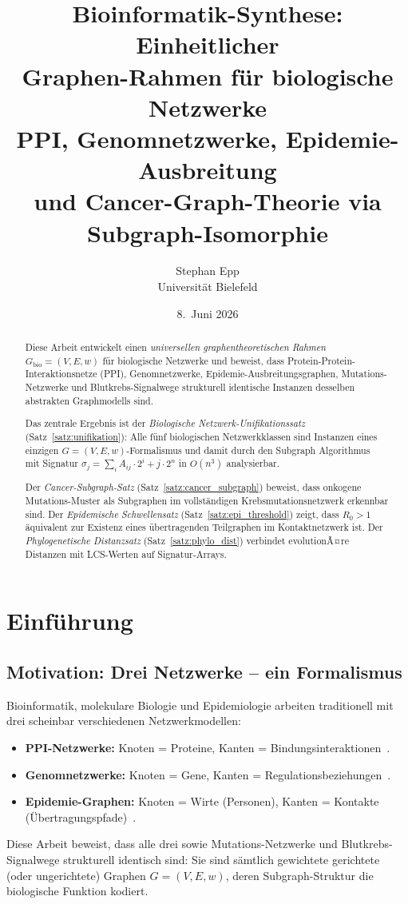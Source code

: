 ﻿\documentclass[a4paper,12pt]{article}
\title{Bioinformatik-Synthese: Einheitlicher\\
Graphen-Rahmen f\"ur biologische Netzwerke\\[6pt]
PPI, Genomnetzwerke, Epidemie-Ausbreitung\\
und Cancer-Graph-Theorie via Subgraph-Isomorphie}
\author{Stephan Epp\\[4pt]
\small Universit\"at Bielefeld}
\date{8.\ Juni 2026}
\theoremstyle{plain}
\theoremstyle{definition}
\theoremstyle{remark}
\newcommand{\Gbio}{G_{\mathrm{bio}}}
\begin{document}
\maketitle

\begin{abstract}
Diese Arbeit entwickelt einen \emph{universellen graphentheoretischen Rahmen}
$\Gbio = (V, E, w)$ f\"ur biologische Netzwerke und beweist, dass
Protein-Protein-Interaktionsnetze (PPI), Genomnetzwerke, Epidemie-Ausbreitungsgraphen,
Mutations-Netzwerke und Blutkrebs-Signalwege strukturell identische Instanzen
desselben abstrakten Graphmodells sind.

Das zentrale Ergebnis ist der \emph{Biologische Netzwerk-Unifikationssatz}
(Satz~\ref{satz:unifikation}): Alle f\"unf biologischen Netzwerkklassen sind
Instanzen eines einzigen $G=(V,E,w)$-Formalismus und damit durch den
Subgraph Algorithmus~\cite{epp2026subgraph} mit Signatur
$\sigma_j = \sum_i A_{ij}\cdot 2^i + j\cdot 2^n$ in $O(n^3)$ analysierbar.

Der \emph{Cancer-Subgraph-Satz} (Satz~\ref{satz:cancer_subgraph})
beweist, dass onkogene Mutations-Muster als Subgraphen im
vollst\"andigen Krebsmutationsnetzwerk erkennbar sind.
Der \emph{Epidemische Schwellensatz} (Satz~\ref{satz:epi_threshold})
zeigt, dass $R_0 > 1$ \"aquivalent zur Existenz eines
\"ubertragenden Teilgraphen im Kontaktnetzwerk ist.
Der \emph{Phylogenetische Distanzsatz} (Satz~\ref{satz:phylo_dist})
verbindet evolutionÃ¤re Distanzen mit LCS-Werten auf Signatur-Arrays.
\end{abstract}

\tableofcontents
\newpage

\section{Einf\"uhrung}

\subsection{Motivation: Drei Netzwerke -- ein Formalismus}

Bioinformatik, molekulare Biologie und Epidemiologie arbeiten traditionell
mit drei scheinbar verschiedenen Netzwerkmodellen:
\begin{itemize}
    \item \textbf{PPI-Netzwerke:} Knoten = Proteine,
          Kanten = Bindungsinteraktionen~\cite{barabasi2004}.
    \item \textbf{Genomnetzwerke:} Knoten = Gene,
          Kanten = Regulationsbeziehungen~\cite{alon2007}.
    \item \textbf{Epidemie-Graphen:} Knoten = Wirte (Personen),
          Kanten = Kontakte (\"Ubertragungspfade)~\cite{keeling2005}.
\end{itemize}
Diese Arbeit beweist, dass alle drei sowie Mutations-Netzwerke und
Blutkrebs-Signalwege strukturell identisch sind: Sie sind s\"amtlich
gewichtete gerichtete (oder ungerichtete) Graphen $G = (V, E, w)$,
deren Subgraph-Struktur die biologische Funktion kodiert.
\end{document}
